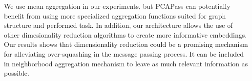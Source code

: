 \documentclass[nohyperref]{article}
\theoremstyle{plain}
\theoremstyle{definition}
\theoremstyle{remark}
\begin{document}
We use mean aggregation in our experiments, but PCAPass can potentially benefit from using more specialized aggregation functions suited for graph structure and performed task. 
In addition, our architecture allows the use of other dimesionality reduction algorithms to create more informative embeddings.
Our results shows that dimensionality reduction could be a promising mechanism for alleviating over-squashing in the message passing process. 
It can be included in neighborhood aggregation mechanism to leave as much relevant information as possible.

\nocite{langley00}



\end{document}
